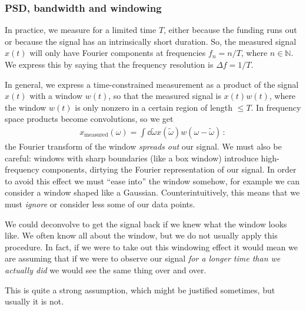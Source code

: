 \documentclass[main.tex]{subfiles}
\begin{document}
\subsubsection{PSD, bandwidth and windowing}

In practice, we measure for a limited time \(T\), either because the funding runs out or because the signal has an intrinsically short duration.
So, the measured signal \(x(t)\) will only have Fourier components at frequencies \(f_n = n / T\), where \(n \in \mathbb{N}\).
We express this by saying that the frequency resolution is \(\Delta f = 1 / T\). 

In general, we express a time-constrained measurement as a product of the signal \(x(t)\) with a window \(w(t)\), so that the measured signal is \(x(t) w(t)\), where the window \(w(t)\) is only nonzero in a certain region of length \(\leq T\).
In frequency space products become convolutions, so we get 
%
\begin{align}
x _{\text{measured}} (\omega ) = \int \dd{\widetilde{\omega}} x(\widetilde{\omega}) w(\omega - \widetilde{\omega} ) 
\,:
\end{align}
%
the Fourier transform of the window \emph{spreads out} our signal.
We must also be careful: windows with sharp boundaries (like a box window) introduce high-frequency components, dirtying the Fourier representation of our signal.
In order to avoid this effect we must ``ease into'' the window somehow, for example we can consider a window shaped like a Gaussian. 
Counterintuitively, this means that we must \emph{ignore} or consider less some of our data points. 

We could deconvolve to get the signal back if we knew what the window looks like. We often know all about the window, but we do not usually apply this procedure. 
In fact, if we were to take out this windowing effect it would mean we are assuming that if we were to observe our signal \emph{for a longer time than we actually did} we would see the same thing over and over.

This is quite a strong assumption, which might be justified sometimes, but usually it is not.
\end{document}
